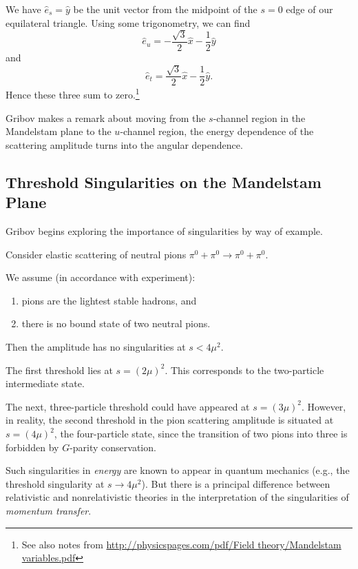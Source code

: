 \M
We have $\widehat{e}_{s}=\widehat{y}$ be the unit vector from the
midpoint of the $s=0$ edge of our equilateral triangle. Using some
trigonometry, we can find
\begin{equation}
\widehat{e}_{u} = -\frac{\sqrt{3}}{2}\widehat{x} - \frac{1}{2}\widehat{y}
\end{equation}
and
\begin{equation}
\widehat{e}_{t} = \frac{\sqrt{3}}{2}\widehat{x} - \frac{1}{2}\widehat{y}.
\end{equation}
Hence these three sum to zero.\footnote{See also notes from
\url{http://physicspages.com/pdf/Field theory/Mandelstam variables.pdf}}

\M[-1]
Gribov makes a remark about moving from the $s$-channel region in the
Mandelstam plane to the $u$-channel region, the energy dependence of the
scattering amplitude turns into the angular dependence.

\subsection{Threshold Singularities on the Mandelstam Plane}

\M
Gribov begins exploring the importance of singularities by way of
example.

\M[1]
Consider elastic scattering of neutral pions
$\pi^{0}+\pi^{0}\to\pi^{0}+\pi^{0}$.

 We assume (in accordance with experiment):
\begin{enumerate}
\item pions are the lightest stable hadrons, and
\item there is no bound state of two neutral pions.
\end{enumerate}

\M Then the amplitude has no singularities at $s<4\mu^{2}$.

\M
The first threshold lies at $s=(2\mu)^{2}$. This corresponds to the
two-particle intermediate state.

\M The next, three-particle threshold could have appeared at
$s=(3\mu)^{2}$.
However, in reality, the second threshold in the pion scattering
amplitude is situated at $s=(4\mu)^{2}$, the four-particle state, since
the transition of two pions into three is forbidden by $G$-parity
conservation.

Such singularities in \emph{energy} are known to appear in quantum
mechanics (e.g., the threshold singularity at $s\to 4\mu^{2}$).
But there is a principal difference between relativistic and
nonrelativistic theories in the interpretation of the singularities of
\emph{momentum transfer}.

